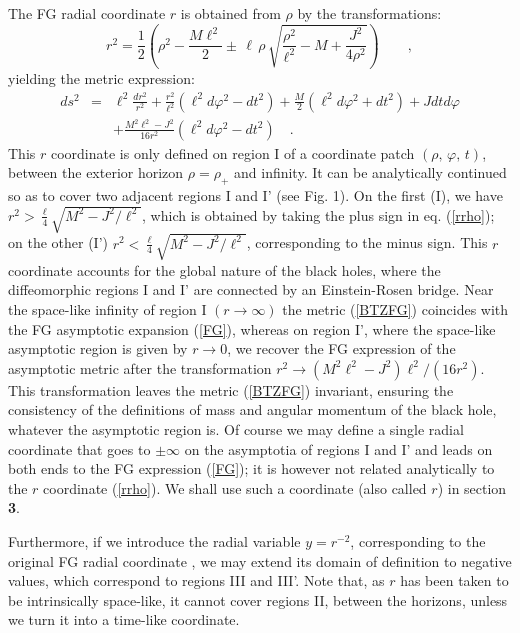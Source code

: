 \documentclass[a4paper,10pt]{article}
\begin{document}
The FG radial coordinate $r$ is obtained from $\rho$ 
by the transformations: 
\begin{equation} 
\label{rrho} 
r^2  = \frac 12 \left( \rho^2 - \frac {M\ell^2} 2 \pm  
\, \ell \, \rho \, \sqrt{\frac {\rho^2}{\ell^2} -M  +  
\frac{J^2} {4 \rho^2} } \right )  \qquad , 
\end{equation} 
yielding the metric expression: 
\begin{eqnarray} 
\label{BTZFG} 
ds^2 &=& \ell^2 \frac {dr^2} {r^2} + 
\frac {r^2} {\ell^2}(\ell ^2 d\varphi^2 -d t^2)+ 
\frac M 2 (\ell ^2 d\varphi^2 +d t^2) + J dt d\varphi \nonumber \\ &&+ 
\frac {M^2 \ell^2 -J^2} {16 r^2} (\ell ^2 d\varphi^2 -d t^2) 
\quad . 
\end{eqnarray} 
This $r$ coordinate is only defined on 
region I of a coordinate patch $(\rho,\, \varphi, \, t)$,  
between the exterior horizon $\rho=\rho_+$ and infinity.  
It can be analytically continued so as to cover two adjacent regions  
I and I' (see Fig. 1). On the first (I), we have 
$r^2> \frac \ell 4 \sqrt{M^2-J^2/\ell^2}$, which is obtained 
by taking the plus sign in eq. (\ref{rrho}); on the other (I') 
$r^2< \frac \ell 4 \sqrt{M^2-J^2/\ell^2}$, corresponding 
to the minus sign. This $r$ coordinate accounts for the global 
nature of the black holes, where the  diffeomorphic regions I and I' are 
connected by an Einstein-Rosen bridge. Near the space-like 
infinity of region I  $(r \rightarrow \infty)$ the metric (\ref{BTZFG}) 
coincides with the FG 
asymptotic expansion (\ref{FG}), whereas on region I', where the space-like 
 asymptotic region is given by 
$r \rightarrow 0$, we recover  the FG expression of the asymptotic metric  
after the transformation 
$r^2 \rightarrow (M^2 \ell^2 -J^2) \ell^2 / (16 r^2)$. This transformation  
leaves the metric (\ref{BTZFG}) invariant, ensuring the consistency 
of the definitions of mass and angular momentum of the black hole, whatever 
the asymptotic region is. 
Of course we may define a single radial coordinate 
that goes to $\pm \infty$ on the asymptotia of regions I and I' and 
leads on both ends to the FG expression (\ref{FG}); it   
is however not related analytically to the $r$ coordinate (\ref{rrho}).  
We shall use such a coordinate (also called $r$) in section {\bf 3}. 
 
Furthermore, if we introduce the radial variable 
$y=r^{-2}$, corresponding to the original FG radial 
coordinate \cite{FG}, 
we may extend its domain of definition to  negative values, which 
correspond to  regions  III and III'. Note that, as $r$ has been taken 
to be intrinsically space-like, it cannot cover regions II, between 
the horizons, unless we turn it into a time-like coordinate.  
  
\end{document}
